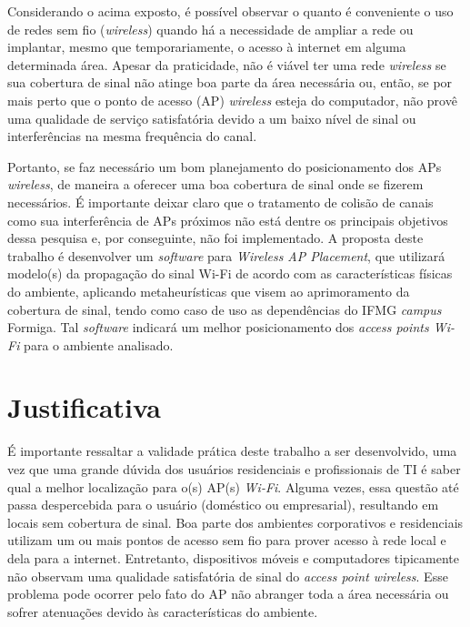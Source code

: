 \documentclass[
	12pt,				%
	openright,			%
	twoside,			%
	a4paper,			%
	english,			%
	french,				%
	spanish,			%
	brazil				%
	]{abntex2}
\begin{document}
Considerando o acima exposto, é possível observar o quanto é conveniente o uso de redes sem fio (\textit{wireless}) quando há a necessidade de ampliar a rede ou implantar, mesmo que temporariamente, o acesso à internet em alguma determinada área. Apesar da praticidade, não é viável ter uma rede \textit{wireless} se sua cobertura de sinal não atinge boa parte da área necessária ou, então, se por mais perto que o ponto de acesso (AP) \textit{wireless} esteja do computador, não provê uma qualidade de serviço satisfatória devido a um baixo nível de sinal ou interferências na mesma frequência do canal. 

Portanto, se faz necessário um bom planejamento do posicionamento dos APs \textit{wireless}, de maneira a oferecer uma boa cobertura de sinal onde se fizerem necessários. É importante deixar claro que o tratamento de colisão de canais como sua interferência de APs próximos não está dentre os principais objetivos dessa pesquisa e, por conseguinte, não foi implementado. A proposta deste trabalho é desenvolver um \textit{software} para \textit{Wireless AP Placement},  que utilizará modelo(s) da propagação do sinal Wi-Fi de acordo com as características físicas do ambiente, aplicando metaheurísticas que visem ao aprimoramento da cobertura de sinal, tendo como caso de uso as dependências do IFMG \textit{campus} Formiga. Tal \textit{software} indicará um melhor posicionamento dos \textit{access points Wi-Fi} para o ambiente analisado.



\section{Justificativa}

É importante ressaltar a validade prática deste trabalho a ser desenvolvido, uma vez que uma grande dúvida dos usuários residenciais e profissionais de TI é saber qual a melhor localização para o(s) AP(s) \textit{Wi-Fi}. Alguma vezes, essa questão até passa despercebida para o usuário (doméstico ou empresarial), resultando em locais sem cobertura de sinal. Boa parte dos ambientes corporativos e residenciais utilizam um ou mais pontos de acesso sem fio para prover acesso à rede local e dela para a internet. Entretanto, dispositivos móveis e computadores tipicamente não observam uma qualidade satisfatória de sinal do \textit{access point wireless}. Esse problema pode ocorrer pelo fato do AP não abranger toda a área necessária ou sofrer atenuações devido às características do ambiente.
\end{document}
